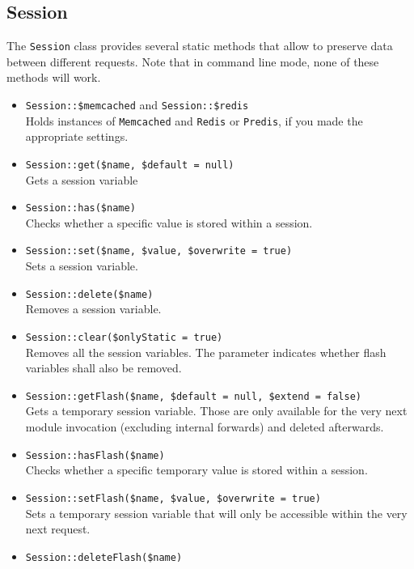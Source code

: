 \documentclass{scrartcl}
\begin{document}
   \subsection{Session}
      The \lstinline!Session! class provides several static methods that allow to preserve data between different requests. Note that in command line mode, none of these methods will work.
      \begin{itemize}
         \item \lstinline!Session::$memcached! and \lstinline!Session::$redis! \\
            Holds instances of \lstinline!Memcached! and \lstinline!Redis! or \lstinline!Predis!, if you made the appropriate settings.
         \item \lstinline!Session::get($name, $default = null)! \\
            Gets a session variable
         \item \lstinline!Session::has($name)! \\
            Checks whether a specific value is stored within a session.
         \item \lstinline!Session::set($name, $value, $overwrite = true)! \\
            Sets a session variable.
         \item \lstinline!Session::delete($name)! \\
            Removes a session variable.
         \item \lstinline!Session::clear($onlyStatic = true)! \\
            Removes all the session variables. The parameter indicates whether flash variables shall also be removed.
         \item \lstinline!Session::getFlash($name, $default = null, $extend = false)! \\
            Gets a temporary session variable. Those are only available for the very next module invocation (excluding internal forwards) and deleted afterwards.
         \item \lstinline!Session::hasFlash($name)! \\
            Checks whether a specific temporary value is stored within a session.
         \item \lstinline!Session::setFlash($name, $value, $overwrite = true)! \\
            Sets a temporary session variable that will only be accessible within the very next request.
         \item \lstinline!Session::deleteFlash($name)! \\

\end{itemize}
\end{document}
